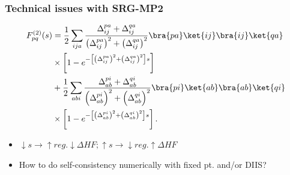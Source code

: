 \begin{frame}
\frametitle{Technical issues with SRG-MP2}
\begin{align}
    F_{pq}^{(2)}(s)  &= \frac{1}{2}\sum_{ija}\frac{\Delta^{pa}_{ij} + \Delta^{qa}_{ij}}{\left(\Delta^{pa}_{ij}\right)^2+\left(\Delta^{qa}_{ij}\right)^2} \bra{pa}\ket{ij}\bra{ij}\ket{qa}
    \nonumber \\
    &\times\left[1-e^{-\left[\left(\Delta^{pa}_{ij}\right)^2+\left(\Delta^{qa}_{ij}\right)^2\right]s}\right] \nonumber \\
    &+ \frac{1}{2}\sum_{abi}\frac{\Delta^{pi}_{ab} + \Delta^{qi}_{ab}}{\left(\Delta^{pi}_{ab}\right)^2+\left(\Delta^{qi}_{ab}\right)^2} \bra{pi}\ket{ab}\bra{ab}\ket{qi}
    \nonumber \\
    &\times\left[1-e^{-\left[\left(\Delta^{pi}_{ab}\right)^2+\left(\Delta^{qi}_{ab}\right)^2\right]s}\right]\label{eq:qsGF2SE}.
\end{align}
\begin{itemize}
    \item $\downarrow s \to \uparrow reg. \downarrow \Delta HF; \uparrow s \to \downarrow reg. \uparrow \Delta HF$
    \item How to do self-consistency numerically with fixed pt. and/or  DIIS?
\end{itemize}
\end{frame}